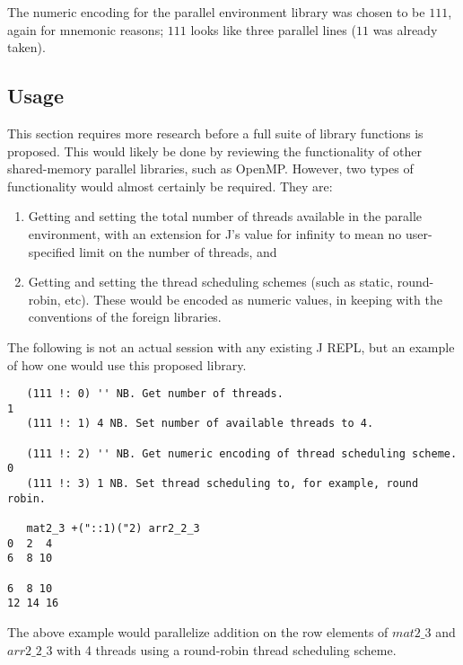 The numeric encoding for the parallel environment library 
was chosen to be $111$, again for mnemonic reasons; 
$111$ looks like three parallel lines ($11$ was already taken).

\subsection{Usage}
This section requires more research before a full suite of library functions is proposed.
This would likely be done by reviewing the functionality of other shared-memory parallel libraries, such as OpenMP. %
However, two types of functionality would almost certainly be required.
They are:

\begin{enumerate}
    \item Getting and setting the total number of threads available in the paralle environment,
        with an extension for J's value for infinity to mean no user-specified limit on the number of threads, and
    \item Getting and setting the thread scheduling schemes (such as static, round-robin, etc).
        These would be encoded as numeric values, in keeping with the conventions of the foreign libraries.
\end{enumerate}

The following is not an actual session with any existing J REPL, 
but an example of how one would use this proposed library.

\begin{singlespacing}
\begin{small}
\begin{verbatim}
   (111 !: 0) '' NB. Get number of threads.
1
   (111 !: 1) 4 NB. Set number of available threads to 4.

   (111 !: 2) '' NB. Get numeric encoding of thread scheduling scheme.
0
   (111 !: 3) 1 NB. Set thread scheduling to, for example, round robin.

   mat2_3 +("::1)("2) arr2_2_3
0  2  4
6  8 10

6  8 10
12 14 16
\end{verbatim}
\end{small}
\end{singlespacing}

The above example would parallelize addition on the row elements of $mat2\_3$ and $arr2\_2\_3$ 
with 4 threads using a round-robin thread scheduling scheme.
